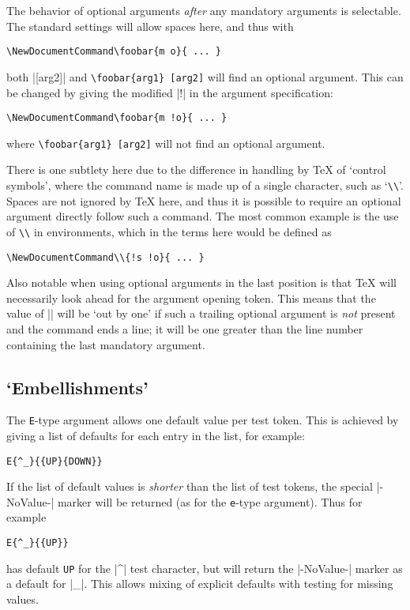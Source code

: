 \documentclass{ltxguide}
\begin{document}
The behavior of optional arguments \emph{after} any mandatory arguments is
selectable. The standard settings will allow spaces here, and thus with
\begin{verbatim}
\NewDocumentCommand\foobar{m o}{ ... }
\end{verbatim}
both |[arg2]| and \verb*|\foobar{arg1} [arg2]| will find an
optional argument. This can be changed by giving the modified |!| in the
argument specification:
\begin{verbatim}
\NewDocumentCommand\foobar{m !o}{ ... }
\end{verbatim}
where \verb*|\foobar{arg1} [arg2]| will not find an optional argument.

There is one subtlety here due to the difference in handling by \TeX{} of
`control symbols', where the command name is made up of a single
character, such as `\texttt{\textbackslash\textbackslash}'.
Spaces are not ignored by \TeX{} here,
and thus it is possible to require an optional argument directly follow such a
command. The most common example is the use of \texttt{\textbackslash\textbackslash}
in  environments, which in the terms here would be defined as
\begin{verbatim}
\NewDocumentCommand\\{!s !o}{ ... }
\end{verbatim}

Also notable when using optional arguments in the last position is that \TeX{}
will necessarily look ahead for the argument opening token. This means that
the value of || will be `out by one' if such a trailing optional
argument is \emph{not} present and the command ends a line; it will be one
greater than the line number containing the last mandatory argument.

\subsection{`Embellishments'}
\label{sec:cmd:embellishment}

The \texttt{E}-type argument allows one default value per test token. This is
achieved by giving a list of defaults for each entry in the list, for example:
\begin{verbatim}
E{^_}{{UP}{DOWN}}
\end{verbatim}
If the list of default values is \emph{shorter} than the list of test tokens,
the special |-NoValue-| marker will be returned (as for the \texttt{e}-type
argument). Thus for example
\begin{verbatim}
E{^_}{{UP}}
\end{verbatim}
has default \texttt{UP} for the |^| test character, but will return the
|-NoValue-| marker as a default for |_|. This allows mixing of explicit
defaults with testing for missing values.
\end{document}
